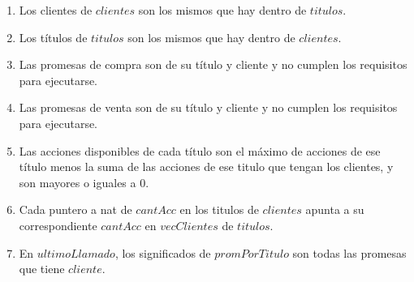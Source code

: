  \begin{enumerate}
 	\item Los clientes de $clientes$ son los mismos que hay dentro de $titulos$.
 	\item Los t\'itulos de $titulos$ son los mismos que hay dentro de $clientes$.
 	\item Las promesas de compra son de su t\'itulo y cliente y no cumplen los requisitos para ejecutarse.
 	\item Las promesas de venta son de su t\'itulo y cliente y no cumplen los requisitos para ejecutarse.
 	\item Las acciones disponibles de cada t\'itulo son el m\'aximo de acciones de ese t\'itulo menos la suma de las acciones de ese titulo que tengan los clientes, y son mayores o iguales a 0.
 	\item Cada puntero a nat de $cantAcc$ en los titulos de $clientes$ apunta a su correspondiente $cantAcc$ en $vecClientes$ de $titulos$.
 	\item En $ultimoLlamado$, los significados de $promPorTitulo$ son todas las promesas que tiene $cliente$.
  \end{enumerate}
  
